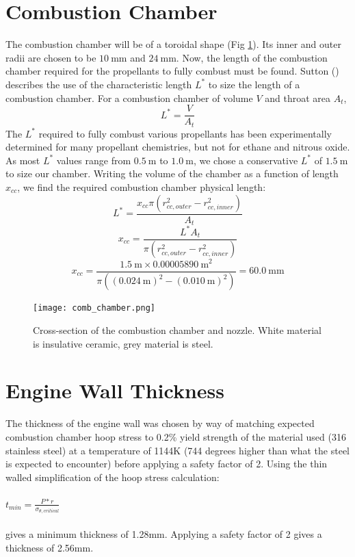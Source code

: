 \documentclass{article}
\begin{document}
\section*{Combustion Chamber}
The combustion chamber will be of a toroidal shape (Fig \ref{comb_chamber}). Its inner and outer radii are chosen to be $\SI{10}{\milli\metre}$ and $\SI{24}{\milli\metre}$.
Now, the length of the combustion chamber required for the propellants to fully combust must be found. Sutton (\cite{RPE}) describes the use of the characteristic length $L^*$ to size the length of a combustion chamber. For a combustion chamber of volume $V$ and throat area $A_t$,
\[ L^* = \frac{V}{A_t} \]
The $L^*$ required to fully combust various propellants has been experimentally determined for many propellant chemistries, but not for ethane and nitrous oxide. As most $L^*$ values range from $\SI{0.5}{\metre}$ to $\SI{1.0}{\metre}$, we chose a conservative $L^*$ of $\SI{1.5}{\metre}$ to size our chamber. Writing the volume of the chamber as a function of length $x_{cc}$, we find the required combustion chamber physical length:
\[ L^* = \frac{x_{cc} \pi(r_{cc,outer}^2 - r_{cc,inner}^2)}{A_t}\]
\[ x_{cc} = \frac{L^* A_t }{ \pi(r_{cc,outer}^2 - r_{cc,inner}^2) } \]
\[ x_{cc} = \frac{ \SI{1.5}{\metre} \times \SI{0.00005890}{\metre\squared} }{ \pi((\SI{0.024}{\metre})^2 - (\SI{0.010}{\metre})^2) } = \SI{60.0}{\milli\metre} \]
\begin{figure}[h!]
\centering
\texttt{[image: comb\_chamber.png]}
\caption{Cross-section of the combustion chamber and nozzle. White material is insulative ceramic, grey material is steel.} 
\label{comb_chamber}
\end{figure}
\section*{Engine Wall Thickness}
The thickness of the engine wall was chosen by way of matching expected combustion chamber hoop stress to 0.2\% yield strength of the material used (316 stainless steel) at a temperature of 1144K (744 degrees higher than what the steel is expected to encounter) before applying a safety factor of 2. Using the thin walled simplification of the hoop stress calculation:\\
\\
$ t_{min} = \frac{P*r}{\sigma_{\theta,critical}}$
\\
\\
gives a minimum thickness of 1.28mm. Applying a safety factor of 2 gives a thickness of 2.56mm.
\end{document}
